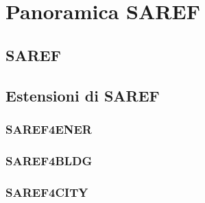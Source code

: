 \chapter{Panoramica SAREF}
\label{cap:panoramicaSaref}
\section{SAREF}

\section{Estensioni di SAREF}

\subsection{SAREF4ENER}

\subsection{SAREF4BLDG}

\subsection{SAREF4CITY}